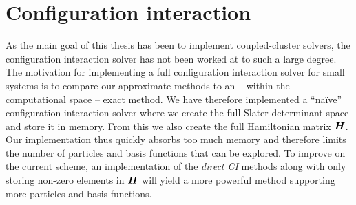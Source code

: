     \section{Configuration interaction}
        As the main goal of this thesis has been to implement coupled-cluster
        solvers, the configuration interaction solver has not been worked at to
        such a large degree.
        The motivation for implementing a full configuration interaction solver
        for small systems is to compare our approximate methods to an -- within
        the computational space -- exact method.
        We have therefore implemented a ``naïve'' configuration interaction
        solver where we create the full Slater determinant space and store it in
        memory.
        From this we also create the full Hamiltonian matrix $\boldsymbol{H}$.
        Our implementation thus quickly absorbs too much memory and therefore
        limits the number of particles and basis functions that can be explored.
        To improve on the current scheme, an implementation of the \emph{direct
        CI} methods \cite{helgaker-molecular, olsen2012full} along with only
        storing non-zero elements in $\boldsymbol{H}$ will yield a more powerful
        method supporting more particles and basis functions.

